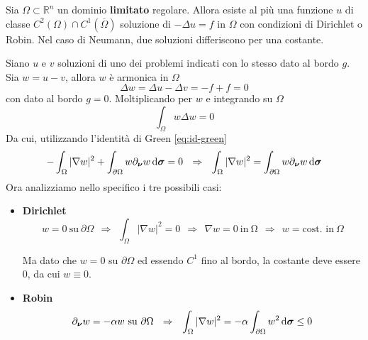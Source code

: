 \begin{theorem}[Unicità]
    Sia $\Omega \subset \mathbb{R}^{n}$ un dominio \textbf{limitato} regolare. Allora esiste al più una funzione $u$ di classe $C^{2}(\Omega) \cap C^{1}(\overline{\Omega })$ soluzione di $-\Delta u=f$ in $\Omega $ con condizioni di Dirichlet o Robin. Nel caso di Neumann, due soluzioni differiscono per una costante.
\end{theorem}
\begin{dimostrazione}
    Siano $u$ e $v$ soluzioni di uno dei problemi indicati con lo stesso dato al bordo $g$. Sia $w=u-v$, allora $w$ è armonica in $\Omega $
    \begin{equation*}
        \Delta w=\Delta u-\Delta v=-f+f=0
    \end{equation*}
    con dato al bordo $g=0$. Moltiplicando per $w$ e integrando su $\Omega $
    \begin{equation*}
        \int _{\Omega } w\Delta w=0
    \end{equation*}
    Da cui, utilizzando l'identità di Green \eqref{eq:id-green}
    \begin{equation*}
        -\int _{\Omega }| \nabla w| ^{2} +\int _{\partial \Omega } w\partial _{\bm{\nu}} w\,\mathrm d \bm{\sigma} =0\ \ \Rightarrow \ \ \int _{\Omega }| \nabla w| ^{2} =\int _{\partial \Omega } w\partial _{\bm{\nu}} w\,\mathrm d \bm{\sigma}
    \end{equation*}
    Ora analizziamo nello specifico i tre possibili casi:
    \begin{itemize}
        \item \textbf{Dirichlet}
              \begin{equation*}
                  w=0\ \text{su} \ \partial \Omega \ \ \Rightarrow \ \ \int _{\Omega }| \nabla w| ^{2} =0\ \ \Rightarrow \ \ \nabla w=0\ \text{in} \ \mathrm{\Omega } \ \ \Rightarrow \ \ w=\text{cost. in} \ \Omega
              \end{equation*}

              Ma dato che $w=0$ su $\displaystyle \partial \Omega $ ed essendo $\displaystyle C^{1}$ fino al bordo, la costante deve essere $0$, da cui $\displaystyle w\equiv 0$.
        \item \textbf{Robin}
              \begin{equation*}
                  \partial_{\bm{\nu}} w=-\alpha w\ \text{su} \ \partial \Omega \ \ \Rightarrow \ \ \int _{\Omega }| \nabla w| ^{2} =-\alpha \int _{\partial \Omega } w^{2} \,\mathrm d \bm{\sigma} \leq 0
              \end{equation*}


\end{itemize}
\end{dimostrazione}

